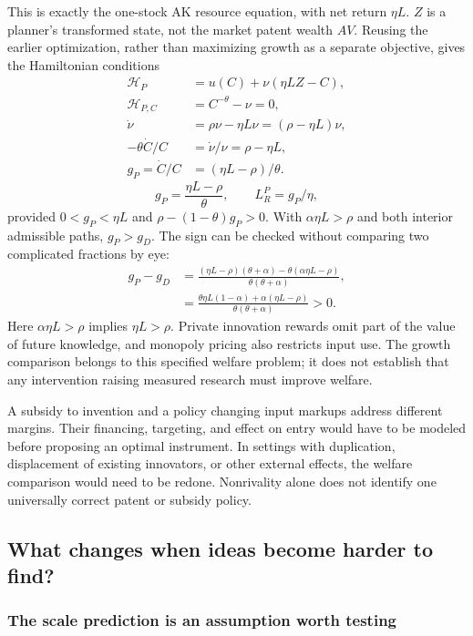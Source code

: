 This is exactly the one-stock AK resource equation, with net return $\eta L$.
$Z$ is a planner's transformed state, not the market patent wealth $AV$.
Reusing the earlier optimization, rather than maximizing growth as a separate
objective, gives
the Hamiltonian conditions
\begin{align}
\mathcal H_P&=u(C)+\nu(\eta LZ-C),\\
\mathcal H_{P,C}&=C^{-\theta}-\nu=0,\\
\dot\nu&=\rho\nu-\eta L\nu=(\rho-\eta L)\nu,\\
-\theta\dot C/C&=\dot\nu/\nu=\rho-\eta L,\\
g_P=\dot C/C&=(\eta L-\rho)/\theta.
\end{align}
\begin{equation}\label{eq:eg-idea-planner-growth}
g_P=\frac{\eta L-\rho}{\theta},\qquad L_R^P=g_P/\eta,
\end{equation}
provided $0<g_P<\eta L$ and $\rho-(1-\theta)g_P>0$.
With $\alpha\eta L>\rho$ and both interior admissible paths,
$g_P>g_D$. The sign can be checked without comparing two complicated fractions by eye:
\begin{align}
g_P-g_D
 &=\frac{(\eta L-\rho)(\theta+\alpha)
          -\theta(\alpha\eta L-\rho)}{\theta(\theta+\alpha)},\\
 &=\frac{\theta\eta L(1-\alpha)+\alpha(\eta L-\rho)}
          {\theta(\theta+\alpha)}>0.
\end{align}
Here $\alpha\eta L>\rho$ implies $\eta L>\rho$.
Private innovation rewards omit part of the value of future knowledge,
and monopoly pricing also restricts input use. The growth comparison belongs
to this specified welfare problem; it does not establish that any intervention
raising measured research must improve welfare.

A subsidy to invention and a policy changing input markups address different
margins. Their financing, targeting, and effect on entry would have to be
modeled before proposing an optimal instrument. In settings with duplication,
displacement of existing innovators, or other external effects, the welfare
comparison would need to be redone. Nonrivality alone does not identify one
universally correct patent or subsidy policy.

\subsection{What changes when ideas become harder to find?}

\subsubsection{The scale prediction is an assumption worth testing}

